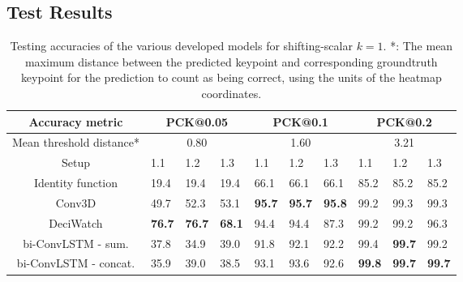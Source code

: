 \documentclass[./main.tex]{subfiles}
\begin{document}
\subsection{Test Results}
\begin{table}[htbp]
    \begin{tabular}{c||lll|lll|lll}
        \hline
        Accuracy metric & \multicolumn{3}{c}{PCK@0.05} & \multicolumn{3}{c}{PCK@0.1} & \multicolumn{3}{c}{PCK@0.2} \\
        \hline
        Mean threshold distance* & \multicolumn{3}{c}{0.80} & \multicolumn{3}{c}{1.60} & \multicolumn{3}{c}{3.21} \\
        \hline
        Setup & 1.1 & 1.2 & 1.3 & 1.1 & 1.2 & 1.3 & 1.1 & 1.2 & 1.3 \\
        \hline
        \hline
        Identity function & 19.4 & 19.4 & 19.4 & 66.1 & 66.1 & 66.1 & 85.2 & 85.2 & 85.2 \\
        Conv3D & 49.7 & 52.3 & 53.1 & \textbf{95.7} & \textbf{95.7} & \textbf{95.8} & 99.2 & 99.3 & 99.3 \\
        DeciWatch & \textbf{76.7} & \textbf{76.7} & \textbf{68.1} & 94.4 & 94.4 & 87.3 & 99.2 & 99.2 & 96.3 \\
        bi-ConvLSTM - sum. & 37.8 & 34.9 & 39.0 & 91.8 & 92.1 & 92.2 & 99.4 & \textbf{99.7} & 99.2 \\
        bi-ConvLSTM - concat. & 35.9 & 39.0 & 38.5 & 93.1 & 93.6 & 92.6 & \textbf{99.8} & \textbf{99.7} & \textbf{99.7} \\
        \hline
    \end{tabular}
    \caption{Testing accuracies of the various developed models for shifting-scalar $k = 1$. *: The mean maximum distance between the predicted keypoint and corresponding groundtruth keypoint for the prediction to count as being correct, using the units of the heatmap coordinates.}
    \label{tab:finetune_test_accs_1}
\end{table}
\end{document}
